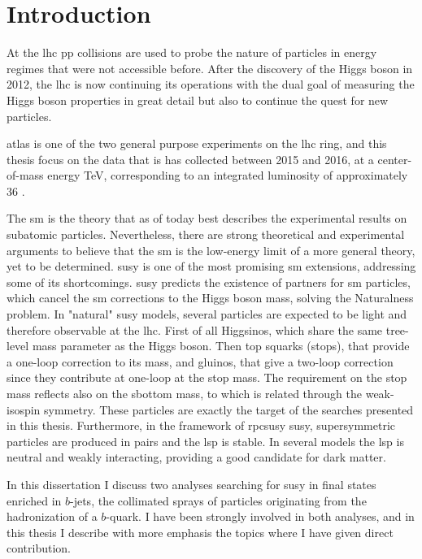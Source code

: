 \chapter*{Introduction}

At the \gls{lhc} \gls{pp} collisions are used to probe the nature of particles in energy regimes that were not accessible before. 
After the discovery of the Higgs boson in 2012, the \gls{lhc} is now continuing its operations with the dual goal 
of measuring the Higgs boson properties in great detail but also to continue the quest for new particles.

\gls{atlas} is one of the two general purpose experiments on the \gls{lhc} ring, and this thesis focus on the data that is has collected between 
2015 and 2016, 
at a center-of-mass energy \cmtre TeV, corresponding to an 
integrated luminosity of approximately 36 \ifb. 

The \gls{sm} is the theory that as of today best describes the experimental results on subatomic particles. 
Nevertheless, there are strong theoretical and experimental arguments to believe that the \gls{sm} is the low-energy limit 
of a more general theory, yet to be determined. 
\gls{susy} is one of the most promising \gls{sm} extensions, 
addressing some of its shortcomings. \gls{susy} predicts the existence of partners for  
\gls{sm} particles, which cancel the \gls{sm} corrections to the Higgs boson mass, solving the Naturalness problem. 
In "natural" \gls{susy} models, several particles are expected to be light and therefore observable at the \gls{lhc}.
First of all Higgsinos, which share the same tree-level mass parameter as the Higgs boson. 
Then top squarks (stops), that provide a one-loop correction to its mass, and gluinos, that give a two-loop correction since they contribute 
at one-loop at the stop mass. 
The requirement on the stop mass reflects also on the sbottom mass, to which is related through the weak-isospin symmetry. 
These particles are exactly the target of the searches presented in this thesis.
Furthermore, in the framework of \gls{rpcsusy} \gls{susy}, supersymmetric particles are produced in pairs and the 
\gls{lsp} is stable. 
In several models the \gls{lsp} is neutral and weakly interacting, providing a good candidate for dark matter.
 

In this dissertation I discuss two analyses searching for \gls{susy} in final states enriched in $b$-jets, the collimated sprays of 
particles originating from the hadronization of a $b$-quark. 
I have been strongly involved in both analyses, 
and in this thesis I describe with more emphasis the topics where I have given direct contribution.

